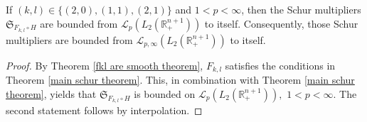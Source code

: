 \documentclass[12pt]{amsart}
\begin{document}
\begin{proposition}\label{fkl schur lemma} If $(k,l)\in\{(2,0),(1,1),(2,1)\}$ and $1<p<\infty$, then the Schur multipliers $\mathfrak{S}_{F_{k,l}\circ H}$ are bounded from $\mathcal{L}_p(L_2(\mathbb{R}^{n+1}_+))$ to itself. Consequently, those Schur multipliers are bounded from $\mathcal{L}_{p,\infty}(L_2(\mathbb{R}^{n+1}_+))$ to itself.
\end{proposition}
\begin{proof} By Theorem \ref{fkl are smooth theorem}, $F_{k,l}$ satisfies the conditions in Theorem \ref{main schur theorem}. This, in combination with Theorem \ref{main schur theorem}, yields that $\mathfrak{S}_{F_{k,l}\circ H}$ is bounded on $\mathcal{L}_p(L_2(\mathbb{R}^{n+1}_+)),$ $1<p<\infty.$ The second statement follows by interpolation.
\end{proof}
\end{document}
